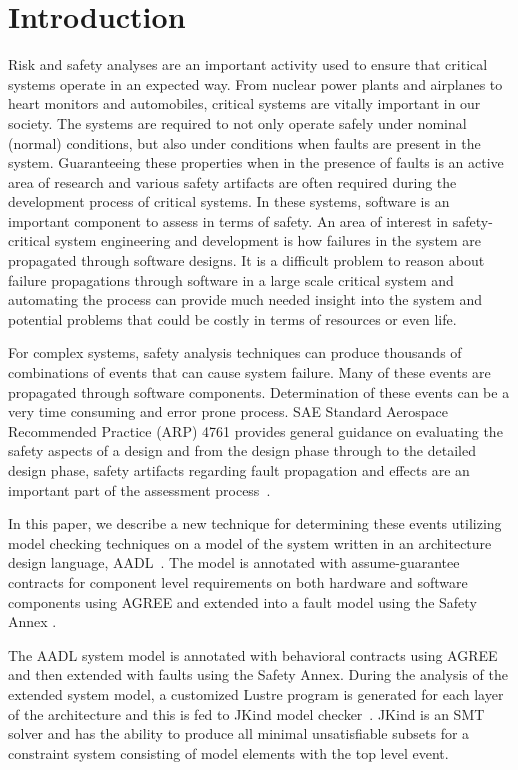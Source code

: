 \section{Introduction}
\label{sec:intro}

Risk and safety analyses are an important activity used to ensure that critical systems operate in an expected way. From nuclear power plants and airplanes to heart monitors and automobiles, critical systems are vitally important in our society. The systems are required to not only operate safely under nominal (normal) conditions, but also under conditions when faults are present in the system. Guaranteeing these properties when in the presence of faults is an active area of research and various safety artifacts are often required during the development process of critical systems. In these systems, software is an important component to assess in terms of safety. An area of interest in safety-critical system engineering and development is how failures in the system are propagated through software designs. It is a difficult problem to reason about failure propagations through software in a large scale critical system and automating the process can provide much needed insight into the system and potential problems that could be costly in terms of resources or even life. 

 For complex systems, safety analysis techniques can produce thousands of combinations of events that can cause system failure. Many of these events are propagated through software components. Determination of these events can be a very time consuming and error prone process. SAE Standard Aerospace Recommended Practice (ARP) 4761 provides general guidance on evaluating the safety aspects of a design and from the design phase through to the detailed design phase, safety artifacts regarding fault propagation and effects are an important part of the assessment process~\cite{SAE:ARP4761}. 

In this paper, we describe a new technique for determining these events utilizing model checking techniques on a model of the system written in an architecture design language, AADL~\cite{AADL_Standard}. The model is annotated with assume-guarantee contracts for component level requirements on both hardware and software components using AGREE and extended into a fault model using the Safety Annex \cite{Stewart17:IMBSA,SATechReport,QFCS15:backes}. 

The AADL system model is annotated with behavioral contracts using AGREE and then extended with faults using the Safety Annex. During the analysis of the extended system model, a customized Lustre program is generated for each layer of the architecture and this is fed to JKind model checker~\cite{2017arXiv171201222G}. JKind is an SMT solver and has the ability to produce all minimal unsatisfiable subsets for a constraint system consisting of model elements with the top level event.

